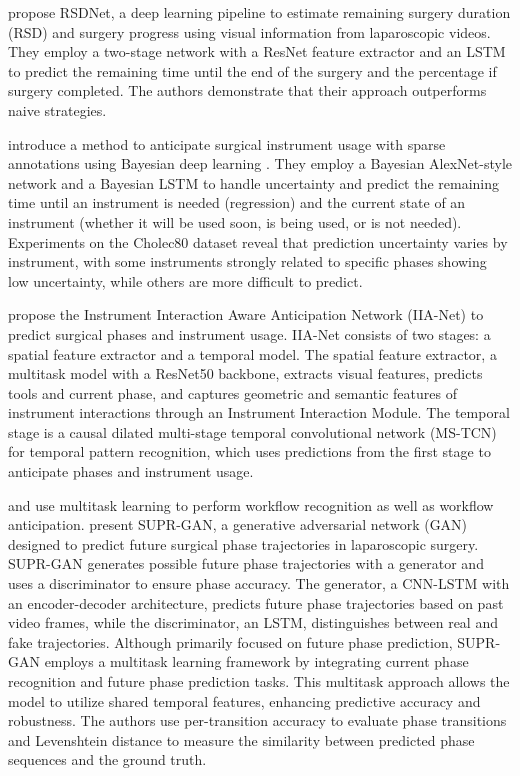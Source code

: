 \citet{twinanda2018rsdnet} propose RSDNet, a deep learning pipeline to estimate remaining surgery duration (RSD) and surgery progress using visual information from laparoscopic videos. They employ a two-stage network with a ResNet feature extractor and an LSTM to predict the remaining time until the end of the surgery and the percentage if surgery completed. The authors demonstrate that their approach outperforms naive strategies.




\citet{rivoir2020rethinking} introduce a method to anticipate surgical instrument usage with sparse annotations using Bayesian deep learning \cite{NIPS2017_2650d608}. They employ a Bayesian AlexNet-style network \cite{alexnet} and a Bayesian LSTM \cite{LSTM} to handle uncertainty and predict the remaining time until an instrument is needed (regression) and the current state of an instrument (whether it will be used soon, is being used, or is not needed). Experiments on the Cholec80 dataset \cite{EndoNet} reveal that prediction uncertainty varies by instrument, with some instruments strongly related to specific phases showing low uncertainty, while others are more difficult to predict.


\citet{yuan2022anticipation} propose the Instrument Interaction Aware Anticipation Network (IIA-Net) to predict surgical phases and instrument usage. IIA-Net consists of two stages: a spatial feature extractor and a temporal model. The spatial feature extractor, a multitask model with a ResNet50 backbone, extracts visual features, predicts tools and current phase, and captures geometric and semantic features of instrument interactions through an Instrument Interaction Module. The temporal stage is a causal dilated multi-stage temporal convolutional network (MS-TCN) for temporal pattern recognition, which uses predictions from the first stage to anticipate phases and instrument usage.

\citet{ban2022supr} and \citet{jin2022trans} use multitask learning to perform workflow recognition as well as workflow anticipation.\citet{ban2022supr} present SUPR-GAN, a generative adversarial network (GAN) designed to predict future surgical phase trajectories in laparoscopic surgery. SUPR-GAN generates possible future phase trajectories with a generator and uses a discriminator to ensure phase accuracy. The generator, a CNN-LSTM with an encoder-decoder architecture, predicts future phase trajectories based on past video frames, while the discriminator, an LSTM, distinguishes between real and fake trajectories.
Although primarily focused on future phase prediction, SUPR-GAN employs a multitask learning framework by integrating current phase recognition and future phase prediction tasks. This multitask approach allows the model to utilize shared temporal features, enhancing predictive accuracy and robustness. The authors use per-transition accuracy to evaluate phase transitions and Levenshtein distance \citep{levenshtein1966binary} to measure the similarity between predicted phase sequences and the ground truth.

